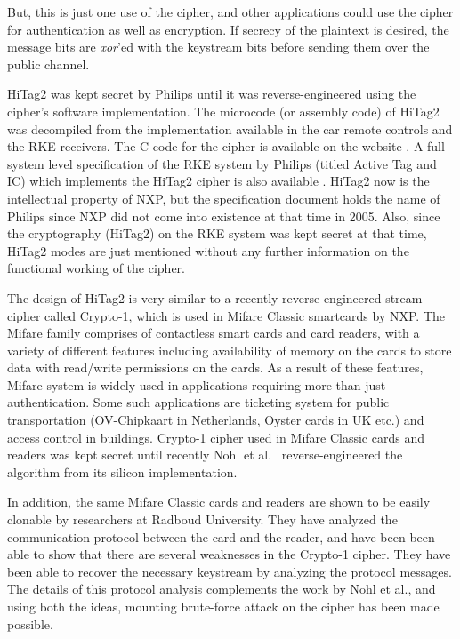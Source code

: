 But, this is just one use of the cipher, and other applications could use the cipher for authentication as well as encryption. If secrecy of the plaintext is desired, the message bits are \emph{xor}'ed with the keystream bits before sending them over the public channel. 

HiTag2 was kept secret by Philips until it was reverse-engineered using the cipher's software implementation. The microcode (or assembly code) of HiTag2 was decompiled from the implementation available in the car remote controls and the RKE receivers. The C code for the cipher is available on the website \cite{hitag2-code}. A full system level specification of the RKE system by Philips (titled Active Tag and IC) which implements the HiTag2 cipher is also available \cite{active-tag-datasheet}. HiTag2 now is the intellectual property of NXP, but the specification document holds the name of Philips since NXP did not come into existence at that time in 2005. Also, since the cryptography (HiTag2) on the RKE system was kept secret at that time, HiTag2 modes are just mentioned without any further information on the functional working of the cipher.

The design of HiTag2 is very similar to a recently reverse-engineered \cite{NohlESP-2008-usenix} stream cipher called Crypto-1, which is used in Mifare Classic smartcards by NXP. The Mifare family comprises of contactless smart cards and card readers, with a variety of different features including availability of memory on the cards to store data with read/write permissions on the cards. As a result of these features, Mifare system is widely used in applications requiring more than just authentication. Some such applications are ticketing system for public transportation (OV-Chipkaart in Netherlands, Oyster cards in UK etc.) and access control in buildings. Crypto-1 cipher used in Mifare Classic cards and readers was kept secret until recently Nohl et al.~\cite{NohlESP-2008-usenix} reverse-engineered the algorithm from its silicon implementation.

In addition, the same Mifare Classic cards and readers are shown to be easily clonable \cite{dekoninggans2008pam} by researchers at Radboud University. They have analyzed the communication protocol between the card and the reader, and have been been able to show that there are several weaknesses in the Crypto-1 cipher. They have been able to recover the necessary keystream by analyzing the protocol messages. The details of this protocol analysis complements the work by Nohl et al., and using both the ideas, mounting brute-force attack on the cipher has been made possible. 

